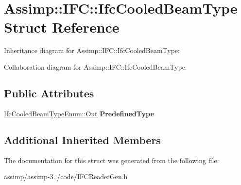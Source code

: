 \hypertarget{struct_assimp_1_1_i_f_c_1_1_ifc_cooled_beam_type}{\section{Assimp\+:\+:I\+F\+C\+:\+:Ifc\+Cooled\+Beam\+Type Struct Reference}
\label{struct_assimp_1_1_i_f_c_1_1_ifc_cooled_beam_type}
}


Inheritance diagram for Assimp\+:\+:I\+F\+C\+:\+:Ifc\+Cooled\+Beam\+Type\+:


Collaboration diagram for Assimp\+:\+:I\+F\+C\+:\+:Ifc\+Cooled\+Beam\+Type\+:
\subsection*{Public Attributes}
\begin{DoxyCompactItemize}
\item 
\hypertarget{struct_assimp_1_1_i_f_c_1_1_ifc_cooled_beam_type_a4a5602be781aff1c2ab11f9e5ef823e2}{\hyperlink{classboost_1_1shared__ptr}{Ifc\+Cooled\+Beam\+Type\+Enum\+::\+Out} {\bfseries Predefined\+Type}}\label{struct_assimp_1_1_i_f_c_1_1_ifc_cooled_beam_type_a4a5602be781aff1c2ab11f9e5ef823e2}

\end{DoxyCompactItemize}
\subsection*{Additional Inherited Members}


The documentation for this struct was generated from the following file\+:\begin{DoxyCompactItemize}
\item 
assimp/assimp-\/3../code/I\+F\+C\+Reader\+Gen.\+h\end{DoxyCompactItemize}
